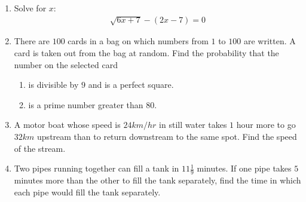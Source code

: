 \begin{enumerate}
\item Solve for $x$:
    \begin{align}
        \sqrt{6x + 7} - (2x - 7) = 0
    \end{align}
\item There are $100$ cards in a bag on which numbers from $1$ to $100$ are written. A card is taken out from the bag at random. Find the probability that the number on the selected card
    \begin{enumerate}
        \item is divisible by $9$ and is a perfect square.
        \item is a prime number greater than $80$.                  \end{enumerate}
\item A motor boat whose speed is $24 km/hr$ in still water takes $1$ hour     more to go $32 km$ upstream than to return downstream to the same spot. Find the speed of the stream.
\item Two pipes running together can fill a tank in $11\frac{1}{9}$ minutes. If one pipe takes $5$ minutes more than the other to fill the tank separately, find the time in which each pipe would fill the tank separately.
\end{enumerate}
